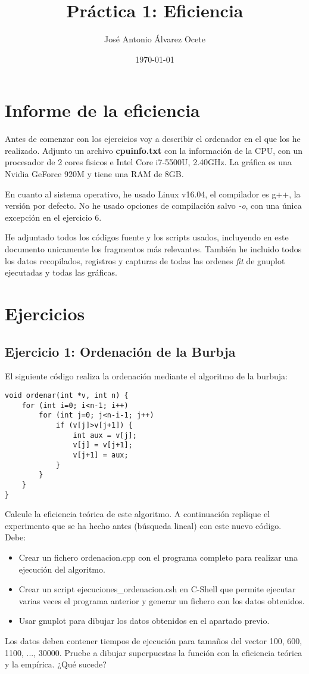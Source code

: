 \documentclass[11pt,a4paper]{article}
\title{Práctica 1: Eficiencia}
\author{José Antonio Álvarez Ocete}
\date{\today}
\begin{document}
\maketitle

\section{Informe de la eficiencia}

Antes de comenzar con los ejercicios voy a describir el ordenador en el que los he realizado. Adjunto un archivo \textbf{cpuinfo.txt} con la información de la CPU, con un procesador de 2 cores fisicos e Intel Core i7-5500U, 2.40GHz. La gráfica es una Nvidia GeForce 920M  y tiene una RAM de 8GB. 

En cuanto al sistema operativo, he usado Linux v16.04, el compilador es g++, la versión por defecto. No he usado opciones de compilación salvo \emph{-o}, con una única excepción en el ejercicio 6.

He adjuntado todos los códigos fuente y los scripts usados, incluyendo en este documento unicamente los fragmentos más relevantes. También he incluido todos los datos recopilados, registros  y capturas de todas las ordenes \emph{fit} de gnuplot ejecutadas y todas las gráficas.

\section{Ejercicios}

\subsection{Ejercicio 1: Ordenación de la Burbja}
El siguiente código realiza la ordenación mediante el algoritmo de la burbuja:
\begin{lstlisting}
void ordenar(int *v, int n) {
	for (int i=0; i<n-1; i++)
		for (int j=0; j<n-i-1; j++)
			if (v[j]>v[j+1]) {
				int aux = v[j];
				v[j] = v[j+1];
				v[j+1] = aux;
			}
		}
	}
}
\end{lstlisting}
Calcule la eficiencia teórica de este algoritmo. A continuación replique el experimento que se ha hecho antes (búsqueda lineal) con este nuevo código. Debe:
\begin{itemize}
	\item Crear un fichero ordenacion.cpp con el programa completo para realizar una ejecución del algoritmo.
	\item Crear un script ejecuciones\_ordenacion.csh en C-Shell que permite ejecutar varias veces el programa anterior y generar un fichero con los datos obtenidos.
	\item Usar gnuplot para dibujar los datos obtenidos en el apartado previo.
\end{itemize}
Los datos deben contener tiempos de ejecución para tamaños del vector 100, 600, 1100, ...,
30000.
Pruebe a dibujar superpuestas la función con la eficiencia teórica y la empírica. ¿Qué
sucede?
\end{document}
